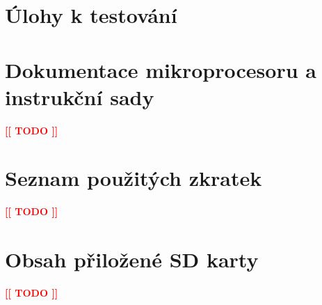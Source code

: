 \documentclass[thesis=B,czech,hidelinks]{template/FITthesis}
\newcommand{\todo}[1]{\textcolor{red}{\textbf{[[ #1 ]]}}}
\begin{document}















\appendix

\chapter{Úlohy k testování}
\label{chap:excercises}


\chapter{Dokumentace mikroprocesoru a instrukční sady}
\todo{TODO}

\chapter{Seznam použitých zkratek}
\todo{TODO}

\chapter{Obsah přiložené SD karty}
\todo{TODO}
\end{document}

